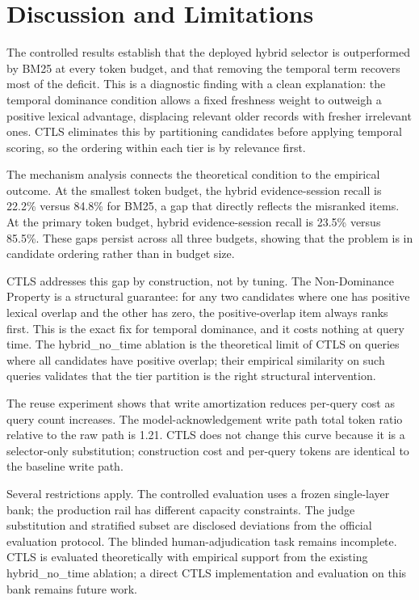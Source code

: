 \section{Discussion and Limitations}

\label{sec:discussion}

The controlled results establish that the deployed hybrid selector is outperformed by BM25 at every token budget, and that removing the temporal term recovers most of the deficit. This is a diagnostic finding with a clean explanation: the temporal dominance condition allows a fixed freshness weight to outweigh a positive lexical advantage, displacing relevant older records with fresher irrelevant ones. CTLS eliminates this by partitioning candidates before applying temporal scoring, so the ordering within each tier is by relevance first.

The mechanism analysis connects the theoretical condition to the empirical outcome. At the smallest token budget, the hybrid evidence-session recall is 22.2\% versus 84.8\% for BM25, a gap that directly reflects the misranked items. At the primary token budget, hybrid evidence-session recall is 23.5\% versus 85.5\%. These gaps persist across all three budgets, showing that the problem is in candidate ordering rather than in budget size.

CTLS addresses this gap by construction, not by tuning. The Non-Dominance Property is a structural guarantee: for any two candidates where one has positive lexical overlap and the other has zero, the positive-overlap item always ranks first. This is the exact fix for temporal dominance, and it costs nothing at query time. The hybrid\_no\_time ablation is the theoretical limit of CTLS on queries where all candidates have positive overlap; their empirical similarity on such queries validates that the tier partition is the right structural intervention.

The reuse experiment shows that write amortization reduces per-query cost as query count increases. The model-acknowledgement write path total token ratio relative to the raw path is 1.21. CTLS does not change this curve because it is a selector-only substitution; construction cost and per-query tokens are identical to the baseline write path.

Several restrictions apply. The controlled evaluation uses a frozen single-layer bank; the production rail has different capacity constraints. The judge substitution and stratified subset are disclosed deviations from the official evaluation protocol. The blinded human-adjudication task remains incomplete. CTLS is evaluated theoretically with empirical support from the existing hybrid\_no\_time ablation; a direct CTLS implementation and evaluation on this bank remains future work.
